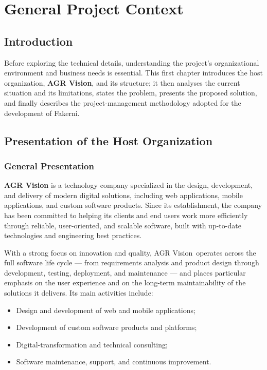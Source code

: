 \documentclass[12pt,a4paper,oneside]{report}
\newcommand{\myCompany}{AGR Vision}
\begin{document}
\chapter{General Project Context}

\section*{Introduction}
Before exploring the technical details, understanding the project's organizational
environment and business needs is essential. This first chapter introduces the
host organization, \textbf{\myCompany}, and its structure; it then analyses the
current situation and its limitations, states the problem, presents the proposed
solution, and finally describes the project-management methodology adopted for the
development of Fakerni.

\section{Presentation of the Host Organization}
\subsection{General Presentation}
\textbf{\myCompany} is a technology company specialized in the design, development,
and delivery of modern digital solutions, including web applications, mobile
applications, and custom software products. Since its establishment, the company
has been committed to helping its clients and end users work more efficiently
through reliable, user-oriented, and scalable software, built with up-to-date
technologies and engineering best practices.

With a strong focus on innovation and quality, \myCompany\ operates across the
full software life cycle --- from requirements analysis and product design through
development, testing, deployment, and maintenance --- and places particular
emphasis on the user experience and on the long-term maintainability of the
solutions it delivers. Its main activities include:

\begin{itemize}[nosep]
  \item Design and development of web and mobile applications;
  \item Development of custom software products and platforms;
  \item Digital-transformation and technical consulting;
  \item Software maintenance, support, and continuous improvement.
\end{itemize}
\end{document}
